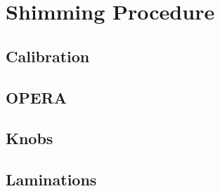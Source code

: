 \section{Shimming Procedure} \label{sec:Shimming-Procedure}


\subsection{Calibration}

\subsection{OPERA}

\subsection{Knobs}

\subsection{Laminations}

